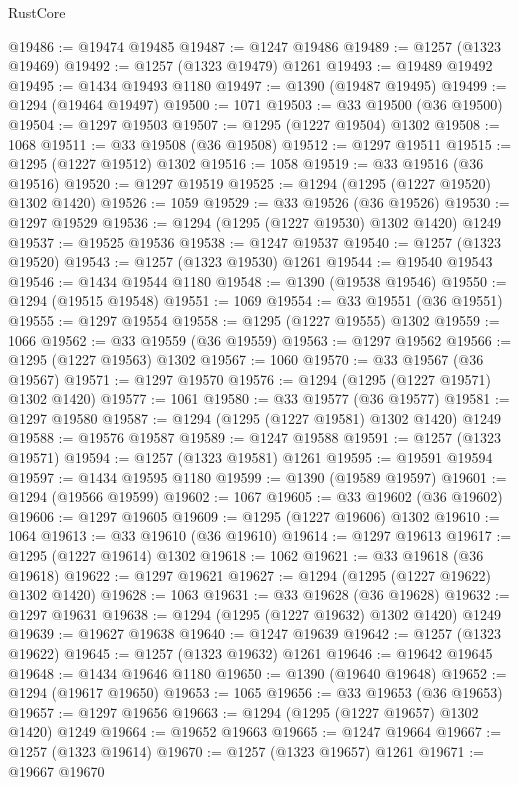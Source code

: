 \begin{lexlean}{RustCore}
\begin{coremodule}
@19486 := @19474 @19485
@19487 := @1247 @19486
@19489 := @1257 (@1323 @19469)
@19492 := @1257 (@1323 @19479) @1261
@19493 := @19489 @19492
@19495 := @1434 @19493 @1180
@19497 := @1390 (@19487 @19495)
@19499 := @1294 (@19464 @19497)
@19500 := 1071
@19503 := @33 @19500 (@36 @19500)
@19504 := @1297 @19503
@19507 := @1295 (@1227 @19504) @1302
@19508 := 1068
@19511 := @33 @19508 (@36 @19508)
@19512 := @1297 @19511
@19515 := @1295 (@1227 @19512) @1302
@19516 := 1058
@19519 := @33 @19516 (@36 @19516)
@19520 := @1297 @19519
@19525 := @1294 (@1295 (@1227 @19520) @1302 @1420)
@19526 := 1059
@19529 := @33 @19526 (@36 @19526)
@19530 := @1297 @19529
@19536 := @1294 (@1295 (@1227 @19530) @1302 @1420) @1249
@19537 := @19525 @19536
@19538 := @1247 @19537
@19540 := @1257 (@1323 @19520)
@19543 := @1257 (@1323 @19530) @1261
@19544 := @19540 @19543
@19546 := @1434 @19544 @1180
@19548 := @1390 (@19538 @19546)
@19550 := @1294 (@19515 @19548)
@19551 := 1069
@19554 := @33 @19551 (@36 @19551)
@19555 := @1297 @19554
@19558 := @1295 (@1227 @19555) @1302
@19559 := 1066
@19562 := @33 @19559 (@36 @19559)
@19563 := @1297 @19562
@19566 := @1295 (@1227 @19563) @1302
@19567 := 1060
@19570 := @33 @19567 (@36 @19567)
@19571 := @1297 @19570
@19576 := @1294 (@1295 (@1227 @19571) @1302 @1420)
@19577 := 1061
@19580 := @33 @19577 (@36 @19577)
@19581 := @1297 @19580
@19587 := @1294 (@1295 (@1227 @19581) @1302 @1420) @1249
@19588 := @19576 @19587
@19589 := @1247 @19588
@19591 := @1257 (@1323 @19571)
@19594 := @1257 (@1323 @19581) @1261
@19595 := @19591 @19594
@19597 := @1434 @19595 @1180
@19599 := @1390 (@19589 @19597)
@19601 := @1294 (@19566 @19599)
@19602 := 1067
@19605 := @33 @19602 (@36 @19602)
@19606 := @1297 @19605
@19609 := @1295 (@1227 @19606) @1302
@19610 := 1064
@19613 := @33 @19610 (@36 @19610)
@19614 := @1297 @19613
@19617 := @1295 (@1227 @19614) @1302
@19618 := 1062
@19621 := @33 @19618 (@36 @19618)
@19622 := @1297 @19621
@19627 := @1294 (@1295 (@1227 @19622) @1302 @1420)
@19628 := 1063
@19631 := @33 @19628 (@36 @19628)
@19632 := @1297 @19631
@19638 := @1294 (@1295 (@1227 @19632) @1302 @1420) @1249
@19639 := @19627 @19638
@19640 := @1247 @19639
@19642 := @1257 (@1323 @19622)
@19645 := @1257 (@1323 @19632) @1261
@19646 := @19642 @19645
@19648 := @1434 @19646 @1180
@19650 := @1390 (@19640 @19648)
@19652 := @1294 (@19617 @19650)
@19653 := 1065
@19656 := @33 @19653 (@36 @19653)
@19657 := @1297 @19656
@19663 := @1294 (@1295 (@1227 @19657) @1302 @1420) @1249
@19664 := @19652 @19663
@19665 := @1247 @19664
@19667 := @1257 (@1323 @19614)
@19670 := @1257 (@1323 @19657) @1261
@19671 := @19667 @19670

\end{coremodule}
\end{lexlean}

